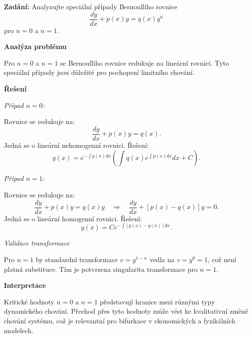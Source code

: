 \begin{example}
\label{ex:b2-kriticke-n}

\noindent\textbf{Zadání:} Analyzujte speciální případy Bernoulliho rovnice
\[
\frac{dy}{dx} + p(x)y = q(x)y^n
\]
pro $n = 0$ a $n = 1$.

\vspace{1.5\baselineskip}

\noindent\textbf{Analýza problému}

\noindent Pro $n = 0$ a $n = 1$ se Bernoulliho rovnice redukuje na lineární rovnici.
Tyto speciální případy jsou důležité pro pochopení limitního chování.

\vspace{1.5\baselineskip}

\noindent\textbf{Řešení}

\noindent\textit{Případ $n = 0$:}

Rovnice se redukuje na:
\[
\frac{dy}{dx} + p(x)y = q(x).
\]
Jedná se o lineární nehomogenní rovnici. Řešení:
\[
y(x) = e^{-\int p(x)dx} \left( \int q(x)e^{\int p(x)dx}dx + C \right).
\]

\noindent\textit{Případ $n = 1$:}

Rovnice se redukuje na:
\[
\frac{dy}{dx} + p(x)y = q(x)y \quad \Rightarrow \quad \frac{dy}{dx} + [p(x) - q(x)]y = 0.
\]
Jedná se o lineární homogenní rovnici. Řešení:
\[
y(x) = Ce^{-\int [p(x) - q(x)]dx}.
\]

\noindent\textit{Validace transformace}

Pro $n = 1$ by standardní transformace $v = y^{1-n}$ vedla na $v = y^0 = 1$, což není 
platná substituce. Tím je potvrzena singularita transformace pro $n = 1$.

\vspace{1.5\baselineskip}

\noindent\textbf{Interpretace}

Kritické hodnoty $n = 0$ a $n = 1$ představují hranice mezi různými typy dynamického 
chování. Přechod přes tyto hodnoty může vést ke kvalitativní změně chování systému, 
což je relevantní pro bifurkace v ekonomických a fyzikálních modelech.

\end{example}

\vspace{2\baselineskip}

